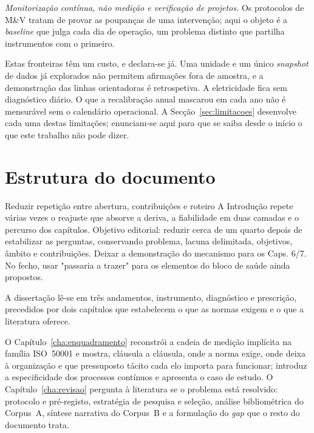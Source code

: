 \emph{Monitorização contínua, não medição e verificação de projetos.}
Os protocolos de M\&V tratam de provar as poupanças de uma intervenção;
aqui o objeto é a \emph{baseline} que julga cada dia de operação, um
problema distinto que partilha instrumentos com o primeiro.

Estas fronteiras têm um custo, e declara-se já. Uma unidade e um único
\emph{snapshot} de dados já explorados não permitem afirmações fora de
amostra, e a demonstração das linhas orientadoras é retrospetiva. A
eletricidade fica sem diagnóstico diário. O que a recalibração anual
mascarou em cada ano não é mensurável sem o calendário operacional. A
Secção~\ref{sec:limitacoes} desenvolve cada uma destas limitações;
enunciam-se aqui para que se saiba desde o início o que este trabalho
não pode dizer.

\section{Estrutura do documento}
\label{sec:estrutura}
{Reduzir repetição entre abertura, contribuições e roteiro}
{A Introdução repete várias vezes o reajuste que absorve a deriva, a
fiabilidade em duas camadas e o percurso dos capítulos. Objetivo editorial:
reduzir cerca de um quarto depois de estabilizar as perguntas, conservando
problema, lacuna delimitada, objetivos, âmbito e contribuições.
Deixar a demonstração do mecanismo para os Caps. 6/7. No fecho, usar
"passaria a trazer" para os elementos do bloco de saúde ainda propostos.}%

A dissertação lê-se em três andamentos, instrumento, diagnóstico e
prescrição, precedidos por dois capítulos que estabelecem o que as
normas exigem e o que a literatura oferece.

O Capítulo~\ref{cha:enquadramento} reconstrói a cadeia de medição
implícita na família ISO~50001 e mostra, cláusula a cláusula, onde a
norma exige, onde deixa à organização e que pressuposto tácito cada elo
importa para funcionar; introduz a especificidade dos processos
contínuos e apresenta o caso de estudo. O Capítulo~\ref{cha:revisao}
pergunta à literatura se o problema está resolvido: protocolo e
pré-registo, estratégia de pesquisa e seleção, análise bibliométrica do
Corpus~A, síntese narrativa do Corpus~B e a formulação do \emph{gap}
que o resto do documento trata.

